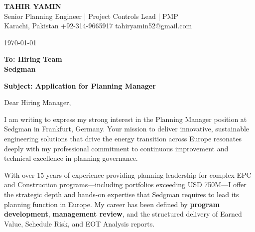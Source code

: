 \documentclass[11pt,a4paper]{article}
\begin{document}
\begin{center}
    {\Huge \textbf{\color{awesome-darknight} TAHIR YAMIN}} \\[0.2cm]
    {\Large \color{awesome-gray} Senior Planning Engineer | Project Controls Lead | PMP} \\[0.3cm]
    
    \small \color{light-gray}
    Karachi, Pakistan \quad \textbullet \quad 
    +92-314-9665917 \quad \textbullet \quad 
    tahiryamin52@gmail.com
\end{center}

\vspace{0.8cm}
\today
\vspace{0.5cm}

\textbf{To: Hiring Team} \\
\textbf{Sedgman} \\
\vspace{0.5cm}

\textbf{Subject: Application for Planning Manager}

\vspace{0.5cm}

Dear Hiring Manager,

I am writing to express my strong interest in the Planning Manager position at Sedgman in Frankfurt, Germany. Your mission to deliver innovative, sustainable engineering solutions that drive the energy transition across Europe resonates deeply with my professional commitment to continuous improvement and technical excellence in planning governance.

With over 15 years of experience providing planning leadership for complex EPC and Construction programs---including portfolios exceeding USD 750M---I offer the strategic depth and hands-on expertise that Sedgman requires to lead its planning function in Europe. My career has been defined by \textbf{program development}, \textbf{management review}, and the structured delivery of Earned Value, Schedule Risk, and EOT Analysis reports.
\end{document}

